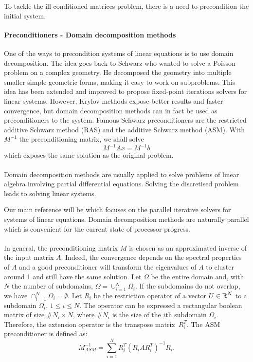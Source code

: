 To tackle the ill-conditioned matrices problem, there is a need to precondition the initial system.


\paragraph{Preconditioners - Domain decomposition methods}
One of the ways to precondition systems of linear equations is to use domain decomposition.
The idea goes back to Schwarz who wanted to solve a Poisson problem on a complex geometry.
He decomposed the geometry into multiple smaller simple geometric forms, making it easy to work on subproblems.
This idea has been extended and improved to propose fixed-point iterations solvers for linear systems.
However, Krylov methods expose better results and faster convergence, but domain decomposition methods can in fact be used as preconditioners to the system.
Famous Schwarz preconditioners are the restricted additive Schwarz method (RAS) and the additive Schwarz method (ASM).
With \(M^{-1}\) the preconditioning matrix, we shall solve
\[M^{-1}Ax = M^{-1}b\]
which exposes the same solution as the original problem.

\paragraph{}
Domain decomposition methods are usually applied to solve problems of linear algebra involving partial differential equations.
Solving the discretised problem leads to solving linear systems.

Our main reference will be \cite{dolean_domain_2015} which focuses on the parallel iterative solvers for systems of linear equations.
Domain decomposition methods are naturally parallel which is convenient for the current state of processor progress.

\paragraph{}
In general, the preconditioning matrix \(M\) is chosen as an approximated inverse of the input matrix \(A\).
Indeed, the convergence depends on the spectral properties of \(A\) and a good preconditioner will transform the eigenvalues of \(A\) to cluster around 1 and still have the same solution.
Let \(\Omega\) be the entire domain and, with \(N\) the number of subdomains, \(\Omega = \cup^N_{i=1} \Omega_i\).
If the subdomains do not overlap, we have \(\cap^N_{i=1} \Omega_i = \emptyset\).
Let \(R_i\) be the restriction operator of a vector \(U \in \operatorname{\mathbb{R}}^N\) to a subdomain \(\Omega_i\), \(1 \le i \le N\).
The operator can be expressed a rectangular boolean matrix of size \(\#N_i \times N\), where \(\#N_i\) is the size of the \(i\)th subdomain \(\Omega_i\).
Therefore, the extension operator is the transpose matrix \(R_i^T\).
The ASM preconditioner is defined as:
\[M^{-1}_{ASM} = \sum^N_{i=1} R_i^T (R_i A R_i^T)^{-1} R_i.\]

